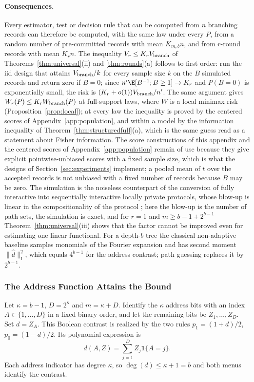 \paragraph{Consequences.}
Every estimator, test or decision rule that can be computed from $n$
branching records can therefore be computed, with the same law under every
$P$, from a random number of pre-committed records with mean $K_{m,b}n$, and
from $r$-round records with mean $K_rn$. The inequality
$V_r\le K_rV_{\rm branch}$ of Theorems~\ref{thm:universal}(ii) and
\ref{thm:rounds}(a) follows to first order: run the iid design that attains
$V_{\rm branch}/k$ for every sample size $k$ on the $B$ simulated records and
return zero if $B=0$; since $n'\E[B^{-1};B\ge1]\to K_r$ and $P(B=0)$ is
exponentially small, the risk is $(K_r+o(1))V_{\rm branch}/n'$. The same
argument gives $W_r(P)\le K_rW_{\rm branch}(P)$ at full-support laws, where
$W$ is a local minimax risk (Proposition~\ref{prop:local}); at every law the
inequality is proved by the centered scores of Appendix~\ref{app:population},
and within a model by the information inequality of
Theorem~\ref{thm:structuredfull}(a), which is the same guess read as a
statement about Fisher information. The score constructions of this appendix and
the centered scores of Appendix~\ref{app:population} remain of use because
they give explicit pointwise-unbiased scores with a fixed sample size, which
is what the designs of Section~\ref{sec:experiments} implement; a pooled mean
of $t$ over the accepted records is not unbiased with a fixed number of
records because $B$ may be zero. The simulation is the noiseless counterpart
of the conversion of fully interactive into sequentially interactive locally
private protocols, whose blow-up is linear in the compositionality of the
protocol \citep{joseph2019}; here the blow-up is the number of path sets,
the simulation is exact, and for $r=1$ and $m\ge b-1+2^{b-1}$
Theorem~\ref{thm:universal}(iii) shows that the factor cannot be improved
even for estimating one linear functional. For a
depth-$b$ tree the classical non-adaptive baseline samples monomials of the
Fourier expansion and has second moment $\|\hat d\|_1^2$, which equals
$4^{b-1}$ for the address contrast; path guessing replaces it by $2^{b-1}$.

\subsubsection{The Address Function Attains the Bound}
Let $\kappa=b-1$, $D=2^\kappa$ and $m=\kappa+D$. Identify the $\kappa$ address bits with an index $A\in\{1,\ldots,D\}$ in a fixed binary order, and let the remaining bits be $Z_1,\ldots,Z_D$. Set $d=Z_A$. This Boolean contrast is realized by the two rules $p_1=(1+d)/2$, $p_0=(1-d)/2$. Its polynomial expression is
\[
 d(A,Z)=\sum_{j=1}^D Z_j\mathbf1\{A=j\}.
\]
Each address indicator has degree $\kappa$, so $\deg(d)\le \kappa+1=b$ and both menus identify the contrast.

